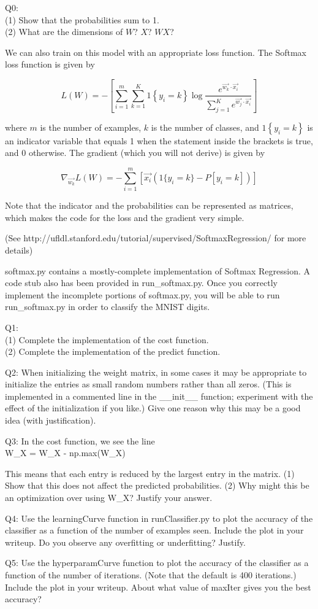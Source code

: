 \documentclass[]{article}
\begin{document}
Q0:\\
    (1) Show that the probabilities sum to 1. \\
    (2) What are the dimensions of $W$? $X$? $WX$?

We can also train on this model with an appropriate loss function. The Softmax loss function is given by

$$L(W) = -\left[ \sum_{i=1}^{m} \sum_{k=1}^{K} 1\left\{y_i = k\right\} \log \frac{e^{\vec{w_k}\cdot \vec{x_i}}}{\sum_{j=1}^K e^{\vec{w_j}\cdot \vec{x_i}}}\right]$$

where $m$ is the number of examples, $k$ is the number of classes, and $1\left\{y_i = k\right\}$
is an indicator variable that equals 1 when the statement inside the brackets is true, and 0
otherwise. The gradient (which you will not derive) is given by

$$\nabla_{\vec{w_k}} L(W) = -\sum_{i=1}^{m}{ \left[ \vec{x_i} \left( 1\{y_i = k\}  - P[y_i = k]\right) \right]}$$

Note that the indicator and the probabilities can be represented as matrices, which makes the code
for the loss and the gradient very simple.

(See http://ufldl.stanford.edu/tutorial/supervised/SoftmaxRegression/ for more 
details)

softmax.py contains a mostly-complete implementation of Softmax Regression. 
A code stub also has been provided in run\_softmax.py. Once you correctly implement
the incomplete portions of softmax.py, you will be able to run run\_softmax.py
in order to classify the MNIST digits.

Q1:\\
    (1) Complete the implementation of the cost function.\\
    (2) Complete the implementation of the predict function.

Q2: When initializing the weight matrix, in some cases it may be appropriate to 
initialize the entries as small random numbers rather than all zeros. (This is implemented in a commented line in the \_\_init\_\_ function; experiment with the effect of the initialization if you like.) Give one 
reason why this may be a good idea (with justification).

Q3: In the cost function, we see the line\\
W\_X = W\_X - np.max(W\_X)

This means that each entry is reduced by the largest entry in the matrix.
    (1) Show that this does not affect the predicted probabilities.
    (2) Why might this be an optimization over using W\_X? Justify your answer.

Q4: Use the learningCurve function in runClassifier.py to plot the accuracy of 
the classifier as a function of the number of examples seen. Include the plot in your writeup. Do you observe any
overfitting or underfitting? Justify.

Q5: Use the hyperparamCurve function to plot the accuracy of the classifier as 
a function of the number of iterations. (Note that the default is 400 iterations.) Include the plot in your writeup. About
what value of maxIter gives you the best accuracy?
\end{document}
